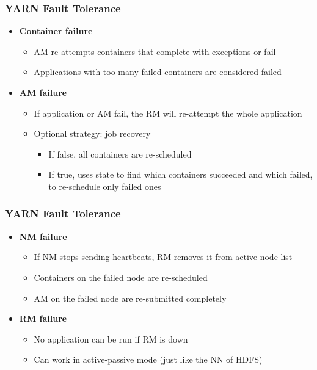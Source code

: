 \begin{frame}
\frametitle{YARN Fault Tolerance}
\begin{itemize}
  \item {\bf Container failure}
  \begin{itemize}
    \item AM re-attempts containers that complete with exceptions or fail
    \item Applications with too many failed containers are considered failed
  \end{itemize}

\vspace{30pt}

  \item {\bf AM failure}
  \begin{itemize}
    \item If application or AM fail, the RM will re-attempt the whole application
    \item Optional strategy: job recovery
    \begin{itemize}
      \item If false, all containers are re-scheduled
      \item If true, uses state to find which containers succeeded and which failed, to re-schedule only failed ones
    \end{itemize}
  \end{itemize}
\end{itemize}
\end{frame}

\begin{frame}
\frametitle{YARN Fault Tolerance}
\begin{itemize}
  \item {\bf NM failure}
  \begin{itemize}
    \item If NM stops sending heartbeats, RM removes it from active node list
    \item Containers on the failed node are re-scheduled
    \item AM on the failed node are re-submitted completely
  \end{itemize}
  
\vspace{30pt}

  \item {\bf RM failure}
  \begin{itemize}
    \item No application can be run if RM is down
    \item Can work in active-passive mode (just like the NN of HDFS)
  \end{itemize}
\end{itemize}
\end{frame}

